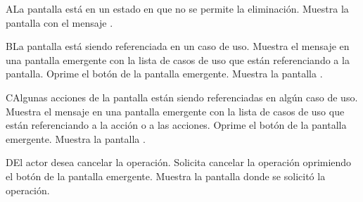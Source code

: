  \begin{UCtrayectoriaA}{A}{La pantalla está en un estado en que no se permite la eliminación.}
    \UCpaso[\UCsist] Muestra la pantalla  con el mensaje .
 \end{UCtrayectoriaA} 
 \begin{UCtrayectoriaA}{B}{La pantalla está siendo referenciada en un caso de uso.}
    \UCpaso[\UCsist] Muestra el mensaje  en una pantalla emergente
    con la lista de casos de uso que están referenciando a la pantalla.
    \UCpaso[\UCactor] Oprime el botón  de la pantalla emergente.
    \UCpaso[\UCsist] Muestra la pantalla .
 \end{UCtrayectoriaA}
 \begin{UCtrayectoriaA}{C}{Algunas acciones de la pantalla están siendo referenciadas en algún caso de uso.}
    \UCpaso[\UCsist] Muestra el mensaje  en una pantalla emergente
    con la lista de casos de uso que están referenciando a la acción o a las acciones.
    \UCpaso[\UCactor] Oprime el botón  de la pantalla emergente.
    \UCpaso[\UCsist] Muestra la pantalla .
 \end{UCtrayectoriaA}
 \begin{UCtrayectoriaA}{D}{El actor desea cancelar la operación.}
    \UCpaso[\UCactor] Solicita cancelar la operación oprimiendo el botón  de la pantalla emergente.
    \UCpaso[\UCsist] Muestra la pantalla donde se solicitó la operación.
 \end{UCtrayectoriaA} 